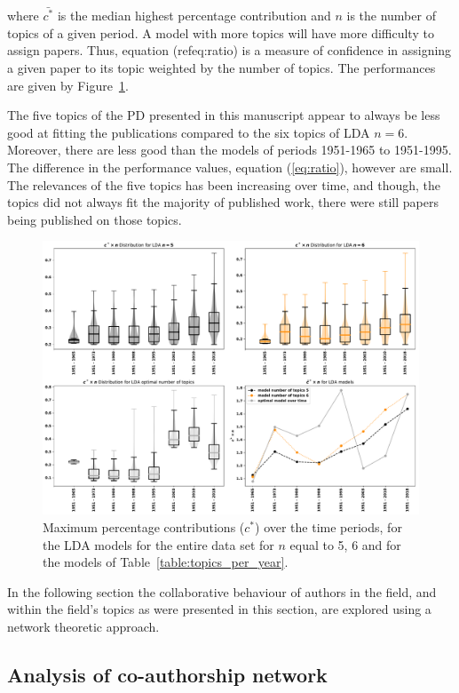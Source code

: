 \documentclass{article}
\theoremstyle{definition}
\begin{document}
where \(\bar{c^*}\) is the median highest percentage contribution and \(n\)
is the number of topics of a given period. A model with more topics will have more
difficulty to assign papers. Thus, equation (ref{eq:ratio}) is a measure of confidence
in assigning a given paper to its topic weighted by the number of topics.
The performances are
given by Figure~\ref{fig:median_percentage_contribution_over_time}.

The five topics of the PD presented in this manuscript appear to always be
less good at fitting the publications compared to the six topics of LDA \(n=6\).
Moreover, there are less good than the models of periods 1951-1965 to 1951-1995.
The difference in the performance values, equation (\ref{eq:ratio}),
however are small. The relevances of the five topics has been increasing
over time, and though, the topics did not always fit the majority of published
work, there were still papers being published on those topics.

\begin{figure}[!hbtp]
    \centering
    \includegraphics[width=.75\textwidth]{./assets/images/contribution_over_time.pdf}
    \caption{Maximum percentage contributions (\(c^*\)) over the time periods,
    for the LDA models for the entire data set for \(n\) equal to 5, 6
    and for the models of Table~\ref{table:topics_per_year}.}
    \label{fig:median_percentage_contribution_over_time}
\end{figure}

In the following section the collaborative behaviour of authors in the field,
and within the field's topics as were presented in this section, are explored
using a network theoretic approach.

\subsection{Analysis of co-authorship network}\label{subsection:co_authorship}
\end{document}
